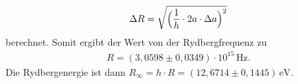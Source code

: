  \begin{align*}
  \Delta R =\sqrt{\Bigl(\frac{1}{h} \cdot 2a \cdot \Delta a\Bigr)^2}
 \end{align*}
 berechnet.
 Somit ergibt der Wert von der Rydbergfrequenz zu
 \begin{align*}
   R =(3,0598 \pm 0,0349) \cdot 10^{15}\,\mathrm{Hz}.
 \end{align*}
 Die Rydbergenergie ist dann \(R_{\infty}=h\cdot R= (12,6714 \pm 0,1445)\,\mathrm{eV}\).

